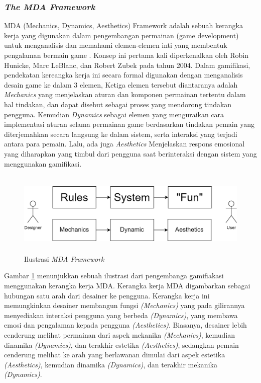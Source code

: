 \subsubsection{\textit{The MDA Framework}}
MDA (Mechanics, Dynamics, Aesthetics) Framework adalah sebuah kerangka kerja yang digunakan dalam pengembangan permainan
(game development) untuk menganalisis dan memahami elemen-elemen inti yang membentuk pengalaman bermain game \cite{marisa2020gamifikasi}. 
Konsep ini pertama kali diperkenalkan oleh Robin Hunicke, Marc LeBlanc, dan Robert Zubek pada tahun 2004.
Dalam gamifikasi, pendekatan kereangka kerja ini secara formal digunakan dengan menganalisis desain game ke dalam 3 elemen,
Ketiga elemen tersebut diantaranya adalah \textit{Mechanics} yang menjelaskan aturan dan komponen permainan tertentu dalam hal tindakan, dan dapat disebut sebagai proses yang mendorong tindakan pengguna.
Kemudian \textit{Dynamics} sebagai elemen yang menguraikan cara implementasi aturan selama permainan game berdasarkan tindakan pemain yang diterjemahkan secara langsung ke dalam sistem, serta interaksi yang terjadi antara para pemain.
Lalu, ada juga \textit{Aesthetics} Menjelaskan respons emosional yang diharapkan yang timbul dari pengguna saat berinteraksi dengan sistem yang menggunakan gamifikasi\cite{marisa2020gamifikasi}.
\begin{figure}[H]
	\centering
	\includegraphics[height=4cm]{contents/chapter-2/images/MDA-framework.png}
	\caption{Ilustrasi \textit{MDA Framework}}
	\label{Fig:Ilustrasi MDA}
\end{figure}
Gambar \ref*{Fig:Ilustrasi MDA} menunjukkan sebuah ilustrasi dari pengembanga gamifiakasi menggunakan kerangka kerja MDA.
Kerangka kerja MDA digambarkan sebagai hubungan satu arah dari desainer ke pengguna.
Kerangka kerja ini memungkinkan desainer membangun fungsi \textit{(Mechanics)} yang pada gilirannya menyediakan interaksi pengguna yang berbeda \textit{(Dynamics)}, yang membawa emosi dan pengalaman kepada pengguna \textit{(Aesthetics)}.
Biasanya, desainer lebih cenderung melihat permainan dari aspek mekanika \textit{(Mechanics)}, kemudian dinamika \textit{(Dynamics)}, dan terakhir estetika \textit{(Aesthetics)}, 
sedangkan pemain cenderung melihat ke arah yang berlawanan dimulai dari aspek estetika \textit{(Aesthetics)}, kemudian dinamika \textit{(Dynamics)}, dan terakhir mekanika \textit{(Dynamics)}.

